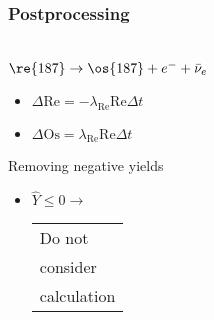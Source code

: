 \begin{frame}
  \frametitle{Postprocessing}
  \begin{minipage}[t][1cm][t]{0.45\linewidth}
    \betadecay \\ $\re{187} \rightarrow \os{187} + e^- + \bar{\nu}_e$
    \begin{itemize}
      \item $\Delta \mathrm{Re} = -\lambda_{\scriptscriptstyle \mathrm{Re}} \mathrm{Re} \Delta t$
      \item $\Delta \mathrm{Os} = \lambda_{\scriptscriptstyle \mathrm{Re}} \mathrm{Re} \Delta t$
    \end{itemize}
  \end{minipage}
  \hfill
  \begin{minipage}[t][1cm][t]{0.45\linewidth}
    Removing negative yields
    \begin{itemize}
      \item $\hat{Y} \leq 0 \rightarrow$ \begin{tabular}{l}Do not \\ consider \\ calculation \end{tabular}
    \end{itemize}
  \end{minipage}
\end{frame}

